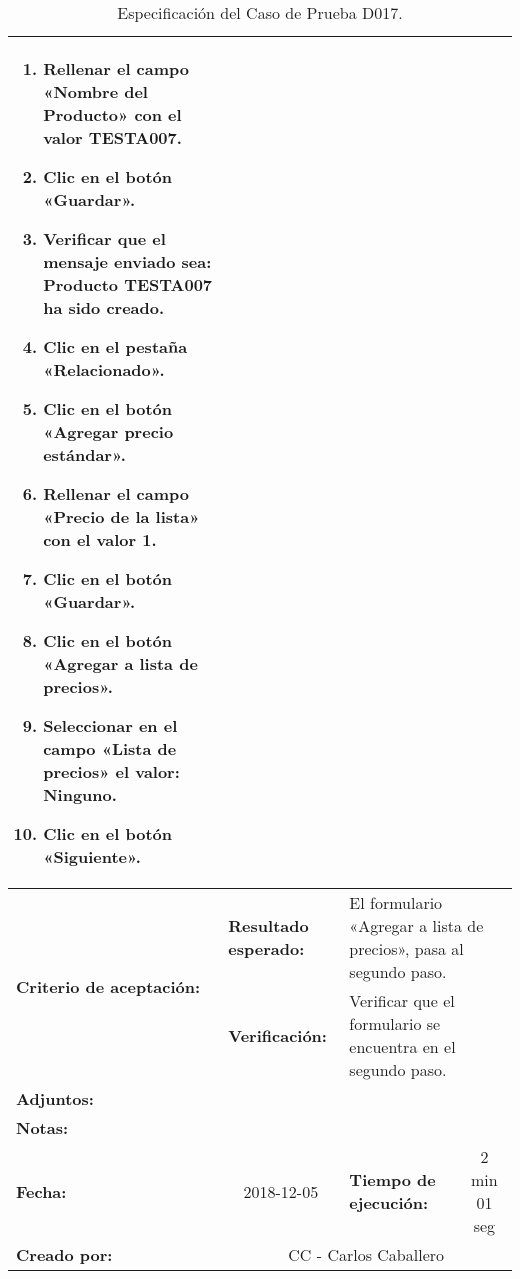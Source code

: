 \begin{table}[H]
\begin{tabular}{|p{2.5cm}|p{2.8cm}|p{2.2cm}|p{2.8cm}|p{2.2cm}|}
{{\begin{enumerate}
\item Rellenar el campo «Nombre del Producto» con el valor \textbf{TESTA007}.
\item Clic en el botón «Guardar».
\item Verificar que el mensaje enviado sea:
    \textbf{Producto TESTA007 ha sido creado}.
\item Clic en el pestaña «Relacionado».
\item Clic en el botón «Agregar precio estándar».
\item Rellenar el campo «Precio de la lista» con el valor \textbf{1}.
\item Clic en el botón «Guardar».
\item Clic en el botón «Agregar a lista de precios».
\item Seleccionar en el campo «Lista de precios» el valor: \textbf{Ninguno}.
\item Clic en el botón «Siguiente».
\end{enumerate}
}} \\
\hline
\multirow{2}{2.8cm}{\footnotesize{\textbf{Criterio de aceptación:}}} &
\footnotesize{\textbf{Resultado esperado:}} &
\multicolumn{3}{p{9.1cm}|}{\footnotesize{El formulario «Agregar a lista de
precios», pasa al segundo paso.}} \\
\cline{2-5}
& \footnotesize{\textbf{Verificación:}} &
\multicolumn{3}{p{9.1cm}|}{\footnotesize{Verificar que el formulario se
encuentra en el segundo paso.}} \\
\hline
\footnotesize{\textbf{Adjuntos:}} &
\multicolumn{4}{p{12.4cm}|}{\footnotesize{}} \\
\hline
\footnotesize{\textbf{Notas:}} &
\multicolumn{4}{p{12.4cm}|}{\footnotesize{}} \\
\hline
\footnotesize{\textbf{Fecha:}} &
\multicolumn{1}{c|}{\footnotesize{2018-12-05}} &
\multicolumn{2}{l|}{\footnotesize{\textbf{Tiempo de ejecución:}}} &
\multicolumn{1}{c|}{\footnotesize{2 min 01 seg}} \\
\hline
\footnotesize{\textbf{Creado por:}} &
\multicolumn{4}{c|}{\footnotesize{CC - Carlos Caballero}} \\
\hline
\end{tabular}
\caption{Especificación del Caso de Prueba D017.}
\label{tcd017}
\end{table}

